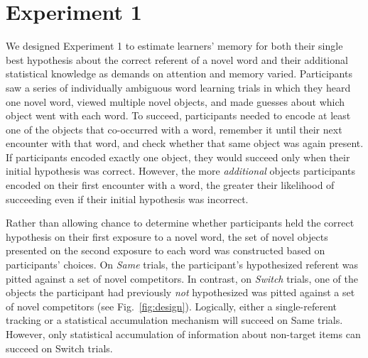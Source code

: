 \documentclass[man,floatsintext]{apa6}
\begin{document}
\section{Experiment 1}

We designed Experiment 1 to estimate learners' memory for both their single best hypothesis about the correct referent of a novel word and their additional statistical knowledge as demands on attention and memory varied. Participants saw a series of individually ambiguous word learning trials in which they heard one novel word, viewed multiple novel objects, and made guesses about which object went with each word. To succeed, participants needed to encode at least one of the objects that co-occurred with a word, remember it until their next encounter with that word, and check whether that same object was again present. If participants encoded exactly one object, they would succeed only when their initial hypothesis was correct. However, the more \emph{additional} objects participants encoded on their first encounter with a word, the greater their likelihood of succeeding even if their initial hypothesis was incorrect. 

Rather than allowing chance to determine whether participants held the correct hypothesis on their first exposure to a novel word, the set of novel objects presented on the second exposure to each word was constructed based on participants' choices. On \emph{Same} trials, the participant's hypothesized referent was pitted against a set of novel competitors. In contrast, on \emph{Switch} trials, one of the objects the participant had previously \emph{not} hypothesized was pitted against a set of novel competitors (see Fig.~\ref{fig:design}). Logically, either a single-referent tracking or a statistical accumulation mechanism will succeed on Same trials. However, only statistical accumulation of information about non-target items can  succeed on Switch trials.
\end{document}
